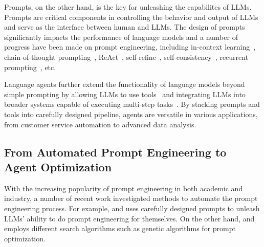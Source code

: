 \documentclass{article}
\begin{document}
Prompts, on the other hand, is the key for unleashing the capabilites of LLMs. Prompts are critical components in controlling the behavior and output of LLMs and serve as the interface between human and LLMs. The design of prompts significantly impacts the performance of language models and a number of progress have been made on prompt engineering, including in-context learning~\citep{gpt3}, chain-of-thought prompting~\citep{nye2022show, wei2022chain}, ReAct~\citep{yao2022react}, self-refine~\citep{madaan2023selfrefine}, self-consistency~\citep{wang2023selfconsistency}, recurrent prompting~\citep{zhou2023recurrentgpt}, etc.

Language agents further extend the functionality of language models beyond simple prompting by allowing LLMs to use tools~\citep{schick2023toolformer} and integrating LLMs into broader systems capable of executing multi-step tasks~\citep{park2023generative,hong2023metagpt,zhou2023agents,chen2023agentverse,OpenAgents}. By stacking prompts and tools into carefully designed pipeline, agents are versatile in various applications, from customer service automation to advanced data analysis. 

\subsection{From Automated Prompt Engineering to Agent Optimization}

With the increasing popularity of prompt engineering in both academic and industry, a number of recent work investigated methods to automate the prompt engineering process. For example, \citet{pryzant2020automatically} and \citet{yang2024large} uses carefully designed prompts to unleash LLMs' ability to do prompt engineering for themselves. On the other hand, \citet{prasad-etal-2023-grips} and \citet{guo2024connecting} employs different search algorithms such as genetic algorithms for prompt optimization.
\end{document}
